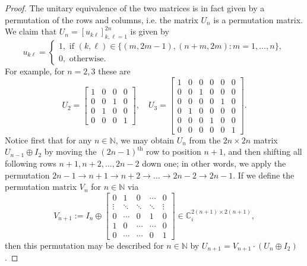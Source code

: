 \documentclass[10pt,a4paper]{amsart}
\def\CC{\mathbb{C}}
\def\NN{\mathbb{N}}
\begin{document}
\begin{proof}
    The unitary equivalence of the two matrices is in fact given by a permutation of the rows and columns, i.e. the matrix \(U_n\) is a permutation matrix. We claim that \(U_n = [u_{k\ell}]_{k,\ell=1}^{2n}\) is given by
    \[
        u_{k\ell} = \begin{cases}1, \text{ if } (k, \ell) \in \{(m, 2m-1), (n+m, 2m) : m = 1, \ldots, n\}, \\ 0, \text{ otherwise}.\end{cases}
    \]
    For example, for \(n = 2,3\) these are
    \[
        U_2 = \begin{bmatrix} 1 & 0 & 0 & 0 \\ 0 & 0 & 1 & 0 \\ 0 & 1 & 0 & 0 \\ 0 & 0 & 0 & 1 \end{bmatrix}, \quad U_3 = \begin{bmatrix} 1 & 0 & 0 & 0 & 0 & 0 \\ 0 & 0 & 1 & 0 & 0 & 0 \\ 0 & 0 & 0 & 0 & 1 & 0 \\ 0 & 1 & 0 & 0 & 0 & 0 \\ 0 & 0 & 0 & 1 & 0 & 0 \\ 0 & 0 & 0 & 0 & 0 & 1 \end{bmatrix}.
    \]
    Notice first that for any \(n \in \NN\), we may obtain \(U_{n}\) from the \(2n \times 2n\) matrix \(U_{n-1} \oplus I_2\) by moving the \((2n-1)^{\text{th}}\) row to position \(n+1\), and then shifting all following rows \(n+1, n+2, \ldots, 2n-2\) down one; in other words, we apply the permutation \(2n-1 \to n+1 \to n+2 \to \ldots \to 2n-2 \to 2n-1\). If we define the permutation matrix \(V_n\) for \(n \in \NN\) via
    \[
        V_{n+1} := I_{n} \oplus \begin{bmatrix} 0 & 1 & 0 & \cdots & 0 \\ \vdots & \ddots & \ddots & \ddots & \vdots \\ 0 & \cdots & 0 & 1 & 0 \\ 1 & 0 & \cdots & \cdots & 0 \\ 0 & \cdots & \cdots & 0 & 1 \end{bmatrix} \in \CC_i^{2(n+1) \times 2(n+1)},
    \]
    then this permutation may be described for \(n \in \NN\) by \(U_{n+1} = V_{n+1} \cdot (U_n \oplus I_2)\).
    

\end{proof}
\end{document}
